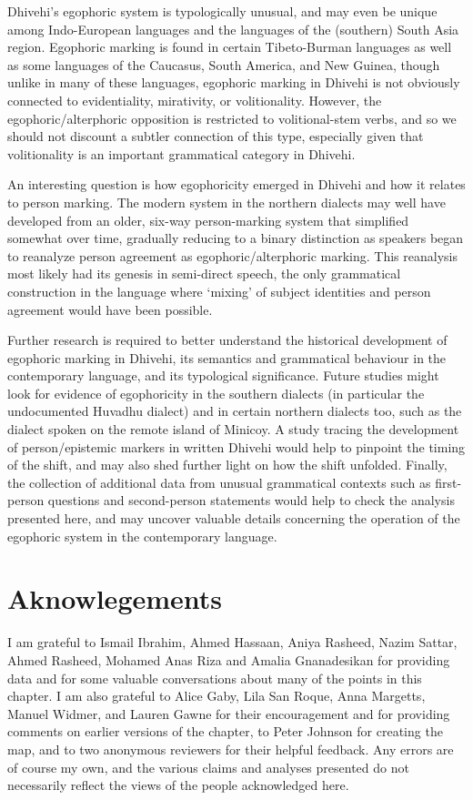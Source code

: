 \documentclass[output=paper]{langsci/langscibook}
\begin{document}
Dhivehi’s egophoric system is typologically unusual, and may even be unique among Indo-European languages and the languages of the (southern) South Asia region. Egophoric marking is found in certain Tibeto-Burman languages as well as some languages of the Caucasus, South America, and New Guinea, though unlike in many of these languages, egophoric marking in Dhivehi is not obviously connected to evidentiality, mirativity, or volitionality. However, the egophoric/alterphoric opposition is restricted to volitional-stem verbs, and so we should not discount a subtler connection of this type, especially given that volitionality is an important grammatical category in Dhivehi.

An interesting question is how egophoricity emerged in Dhivehi and how it relates to person marking. The modern system in the northern dialects may well have developed from an older, six-way person-marking system that simplified somewhat over time, gradually reducing to a binary distinction as speakers began to reanalyze person agreement as egophoric/alterphoric marking. This reanalysis most likely had its genesis in semi-direct speech, the only grammatical construction in the language where ‘mixing’ of subject identities and person agreement would have been possible. 

Further research is required to better understand the historical development of egophoric marking in Dhivehi, its semantics and grammatical behaviour in the contemporary language, and its typological significance. Future studies might look for evidence of egophoricity in the southern dialects (in particular the undocumented Huvadhu dialect) and in certain northern dialects too, such as the dialect spoken on the remote island of Minicoy. A study tracing the development of person/epistemic markers in written Dhivehi would help to pinpoint the timing of the shift, and may also shed further light on how the shift unfolded. Finally, the collection of additional data from unusual grammatical contexts such as first-person questions and second-person statements would help to check the analysis presented here, and may uncover valuable details concerning the operation of the egophoric system in the contemporary language.


\section*{Aknowlegements}

I am grateful to Ismail Ibrahim, Ahmed Hassaan, Aniya Rasheed, Nazim Sattar, Ahmed Rasheed, Mohamed Anas Riza and Amalia Gnanadesikan for providing data and for some valuable conversations about many of the points in this chapter. I am also grateful to Alice Gaby, Lila San Roque, Anna Margetts, Manuel Widmer, and Lauren Gawne for their encouragement and for providing comments on earlier versions of the chapter, to Peter Johnson for creating the map, and to two anonymous reviewers for their helpful feedback. Any errors are of course my own, and the various claims and analyses presented do not necessarily reflect the views of the people acknowledged here.
\end{document}
